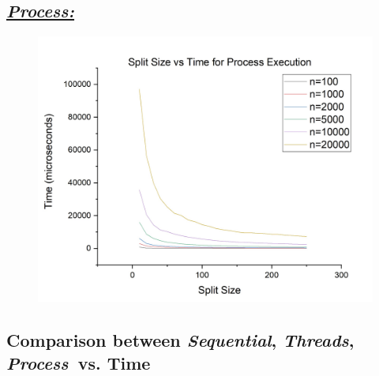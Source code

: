\documentclass{article}
\begin{document}
            \subsection*{\color{blue}\textit{\underline{Process:}}\color{black}}
                \begin{figure}[H]
                    \centering
                    \includegraphics[width=19cm]{nsvt-Process}
                \end{figure}
            \subsection*{Comparison between \textit{Sequential}, \color{red}\textit{Threads}\color{black}, \color{blue}\textit{Process}\color{black}\ vs. Time}
\end{document}
